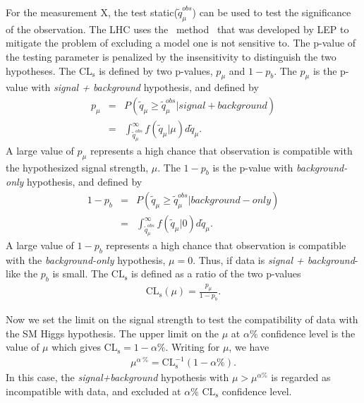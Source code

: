 %
For the measurement X, the test static($\tilde{q}_\mu^{obs}$) can be used to 
test the significance of the observation. The LHC uses the \CLs\ 
method~\cite{Read:451614,Junk:1999kv} that was developed by LEP 
to mitigate the problem of excluding a model one is not sensitive to. 
The p-value of the testing parameter is penalized by the insensitivity 
to distinguish the two hypotheses.  
The $\textrm{CL}_\textrm{s}$ is defined by two p-values, $p_\mu$ and $1-p_b$. 
The $p_\mu$ is the p-value with \textit{signal + background} hypothesis, and defined by 
\begin{eqnarray} 
p_\mu
&=& P\left(\tilde{q}_\mu \ge \tilde{q}_\mu^{obs} | signal+background \right)  \\
&=& \int^{\infty}_{\tilde{q}_\mu^{obs}}  f\left(  \tilde{q}_\mu | \mu \right) d\tilde{q}_\mu.
\end{eqnarray} 
A large value of $p_\mu$ represents a high chance that observation is compatible 
with the hypothesized signal strength, $\mu$.
The $1-p_b$ is the p-value with \textit{background-only} hypothesis, and defined by 
\begin{eqnarray} 
1-p_b
&=& P\left(\tilde{q}_\mu \ge \tilde{q}_\mu^{obs} | background-only \right)  \\
&=& \int^{\infty}_{\tilde{q}_\mu^{obs}}  f\left(  \tilde{q}_\mu | 0 \right) d\tilde{q}_\mu.
\end{eqnarray} 
A large value of $1-p_b$ represents a high chance that observation is compatible 
with the \textit{background-only} hypothesis, $\mu=0$. Thus, if data is 
\textit{signal + background}-like the $p_b$ is small. 
The $\textrm{CL}_\textrm{s}$ is defined as a ratio of the two p-values 
\begin{eqnarray} 
\textrm{CL}_\textrm{s} \left( \mu \right) = \frac{p_\mu}{1 - p_b}.   
\end{eqnarray} 

Now we set the limit on the signal strength to test the 
compatibility of data with the SM Higgs hypothesis. 
The upper limit on the $\mu$ at $\alpha$\% confidence level is the value of $\mu$  
which gives $\textrm{CL}_\textrm{s} = 1 - \alpha \%$. Writing for $\mu$, we have 
\begin{eqnarray} 
\mu^{\alpha~\%} = \textrm{CL}_\textrm{s}^{-1} ( 1-\alpha\%).
\end{eqnarray} 
In this case, the \textit{signal+background} hypothesis with $\mu > \mu^{\alpha \%}$
is regarded as incompatible with data, and excluded at $\alpha\%$ $\textrm{CL}_\textrm{s}$ 
confidence level.

